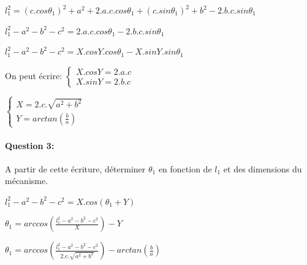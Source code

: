 $l_1^2=(c.cos\theta_1)^2+a^2+2.a.c.cos\theta_1+(c.sin\theta_1)^2+b^2-2.b.c.sin\theta_1$

$l_1^2-a^2-b^2-c^2=2.a.c.cos\theta_1-2.b.c.sin\theta_1$

$l_1^2-a^2-b^2-c^2=X.cos Y.cos\theta_1-X.sin Y.sin\theta_1$

On peut écrire:
\begin{math}
\left\{
\begin{array}{l}
X.cos Y=2.a.c\\
X.sin Y=2.b.c
\end{array}\right.
\end{math}

\begin{math}
\left\{
\begin{array}{l}
X=2.c.\sqrt{a^2+b^2}\\
Y=arctan\left(\frac{b}{a}\right)
\end{array}\right.
\end{math}

\paragraph{Question 3:} A partir de cette écriture, déterminer $\theta_1$ en fonction de $l_1$ et des dimensions du mécanisme.

$l_1^2-a^2-b^2-c^2=X.cos(\theta_1+Y)$

$\theta_1=arccos\left(\frac{l_1^2-a^2-b^2-c^2}{X}\right)-Y$

$\theta_1=arccos\left(\frac{l_1^2-a^2-b^2-c^2}{2.c.\sqrt{a^2+b^2}}\right)-arctan\left(\frac{b}{a}\right)$


